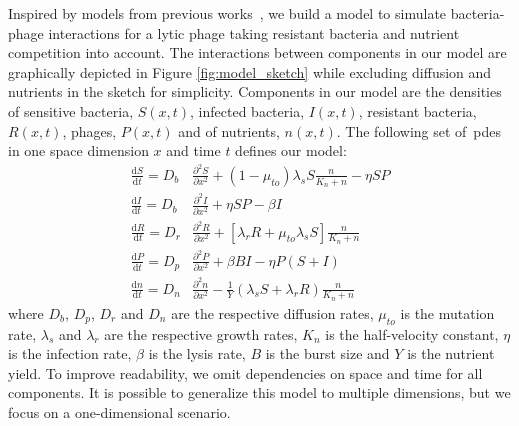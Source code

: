 Inspired by models from previous works~\cite{Ping2020-vd, Claydon2021-cu}, we build a model to simulate bacteria-phage interactions for a lytic phage taking resistant bacteria and nutrient competition into account. The interactions between components in our model are graphically depicted in Figure \ref{fig:model_sketch} while excluding diffusion and nutrients in the sketch for simplicity. Components in our model are the densities of sensitive bacteria, $S(x,t)$, infected bacteria, $I(x,t)$, resistant bacteria, $R(x,t)$, phages, $P(x,t)$ and of nutrients, $n(x,t)$. The following set of~\gls{pde}s in one space dimension $x$ and time $t$ defines our model:
\begin{align}
    \frac{\text{d}S}{\text{d}t} = D_b &\frac{\partial^2S}{\partial x^2} + \left( 1 - \mu_{to} \right) \lambda_s S \frac{n}{K_n+n}  - \eta SP \\
    \frac{\text{d}I}{\text{d}t} = D_b &\frac{\partial^2I}{\partial x^2} + \eta SP - \beta I\\
    \frac{\text{d}R}{\text{d}t} = D_r &\frac{\partial^2R}{\partial x^2} + \left[\lambda_r R + \mu_{to} \lambda_s S \right] \frac{n}{K_n+n}\\
    \frac{\text{d}P}{\text{d}t} = D_p &\frac{\partial^2P}{\partial x^2} + \beta BI - \eta P(S+I) \\
    \frac{\text{d}n}{\text{d}t} = D_n &\frac{\partial^2n}{\partial x^2} - \frac{1}{Y} \left( \lambda_s S + \lambda_r R \right) \frac{n}{K_n+n}
\end{align}
where $D_b$, $D_p$, $D_r$ and $D_n$ are the respective diffusion rates, $\mu_{to}$ is the mutation rate, $\lambda_s$ and $\lambda_r$ are the respective growth rates, $K_n$ is the half-velocity constant, $\eta$ is the infection rate, $\beta$ is the lysis rate, $B$ is the burst size and $Y$ is the nutrient yield. To improve readability, we omit dependencies on space and time for all components. It is possible to generalize this model to multiple dimensions, but we focus on a one-dimensional scenario.

